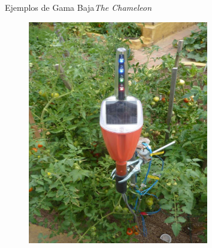 \documentclass[]{beamer}
\begin{document}
\begin{frame}{Ejemplos de Gama Baja}{\emph{The Chameleon}}
  \begin{figure}
    \includegraphics[width=0.7\textwidth]{Docs/chameleon1}
    \caption{}
    \label{}
  \end{figure}

\end{frame}
\end{document}
